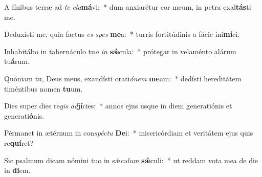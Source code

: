 \item A fínibus terræ ad \textit{te} \textit{cla}\textbf{má}vi:~* dum anxiarétur cor meum, in petra exal\textbf{tás}ti me.
\item Deduxísti me, quia factus \textit{es} \textit{spes} \textbf{me}a:~* turris fortitúdinis a fácie ini\textbf{mí}ci.
\item Inhabitábo in tabernáculo tu\textit{o} \textit{in} \textbf{sǽ}cula:~* prótegar in velaménto alárum tu\textbf{á}rum.
\item Quóniam tu, Deus meus, exaudísti orati\textit{ó}\textit{nem} \textbf{me}am:~* dedísti hereditátem timéntibus nomen \textbf{tu}um.
\item Dies super dies re\textit{gis} \textit{ad}\textbf{jí}cies:~* annos ejus usque in diem generatiónis et generati\textbf{ó}nis.
\item Pérmanet in ætérnum in con\textit{spéc}\textit{tu} \textbf{De}i:~* misericórdiam et veritátem ejus quis re\textbf{quí}ret?
\item Sic psalmum dicam nómini tuo in sǽ\textit{cu}\textit{lum} \textbf{sǽ}culi:~* ut reddam vota mea de die in \textbf{di}em.
